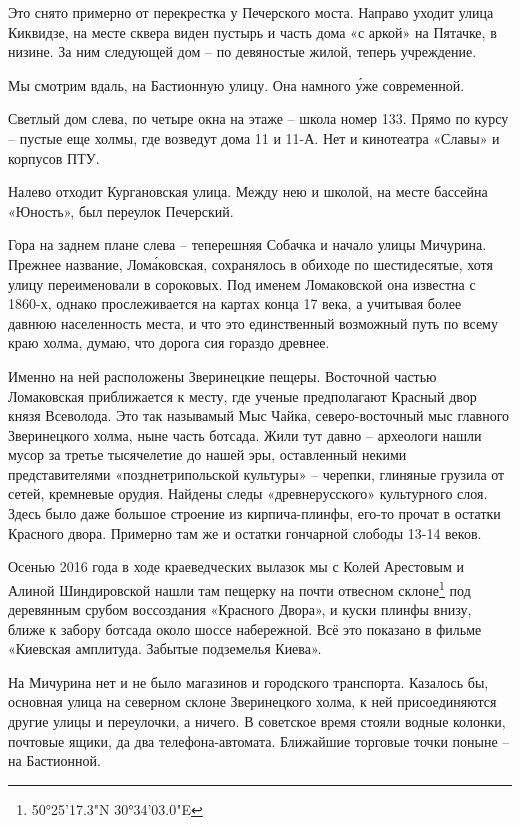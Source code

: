 Это снято примерно от перекрестка у Печерского моста. Направо уходит улица Киквидзе, на месте сквера виден пустырь и часть дома «с аркой» на Пятачке, в низине. За ним следующей дом – по девяностые жилой, теперь учреждение. 

Мы смотрим вдаль, на Бастионную улицу. Она намного \'уже современной.

Светлый дом слева, по четыре окна на этаже – школа номер 133. Прямо по курсу – пустые еще холмы, где возведут дома 11 и 11-А. Нет и кинотеатра «Славы» и корпусов ПТУ.

Налево отходит Кургановская улица. Между нею и школой, на месте бассейна «Юность», был переулок Печерский.

Гора на заднем плане слева – теперешняя Собачка и начало улицы Мичурина. Прежнее название, Лом\'аковская, сохранялось в обиходе по шестидесятые, хотя улицу переименовали в сороковых. Под именем Ломаковской она известна с 1860-х, однако прослеживается на картах конца 17 века, а учитывая более давнюю населенность места, и что это единственный возможный путь по всему краю холма, думаю, что дорога сия гораздо древнее.

Именно на ней расположены Зверинецкие пещеры. Восточной частью Ломаковская приближается к месту, где ученые предполагают Красный двор князя Всеволода. Это так называмый Мыс Чайка, северо-восточный мыс главного Зверинецкого холма, ныне часть ботсада. Жили тут давно – археологи нашли мусор за третье тысячелетие до нашей эры, оставленный некими представителями «позднетрипольской культуры» – черепки, глиняные грузила от сетей, кремневые орудия. Найдены следы «древнерусского» культурного слоя. Здесь было даже большое строение из кирпича-плинфы, его-то прочат в остатки Красного двора. Примерно там же и остатки гончарной слободы 13-14 веков.

Осенью 2016 года в ходе краеведческих вылазок мы с Колей Арестовым и Алиной Шиндировской нашли там пещерку на почти отвесном склоне\footnote{50°25'17.3"N 30°34'03.0"E} под деревянным срубом воссоздания «Красного Двора», и куски плинфы внизу, ближе к забору ботсада около шоссе набережной. Всё это показано в фильме «Киевская амплитуда. Забытые подземелья Киева».

На Мичурина нет и не было магазинов и городского транспорта. Казалось бы, основная улица на северном склоне Зверинецкого холма, к ней присоединяются другие улицы и переулочки, а ничего. В советское время стояли водные колонки, почтовые ящики, да два телефона-автомата. Ближайшие торговые точки поныне – на Бастионной.

